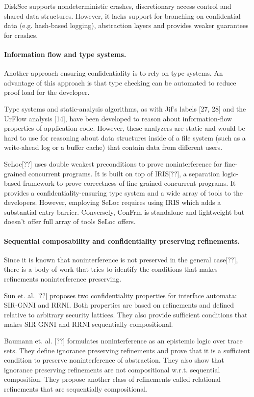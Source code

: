 DiskSec supports nondeterministic crashes, discretionary access control and shared data structures. However, it lacks support for branching on confidential data (e.g. hash-based logging), abstraction layers and provides weaker guarantees for crashes.

\paragraph{Information flow and type systems.} 
Another approach ensuring confidentiality is to rely on type systems. An advantage of this approach is that type checking can be automated to reduce proof load for the developer.

Type systems and static-analysis algorithms, as with
Jif’s labels [27, 28] and the UrFlow analysis [14], have been
developed to reason about information-flow properties of
application code. However, these analyzers are static and
would be hard to use for reasoning about data structures
inside of a file system (such as a write-ahead log or a
buffer cache) that contain data from different users.

SeLoc[??] uses double weakest preconditions to prove noninterference for fine-grained concurrent programs. It is built on top of IRIS[??], a separation logic-based framework to prove correctness of fine-grained concurrent programs. It provides a confidentiality-ensuring type system and a wide array of tools to the developers. However, employing SeLoc requires using IRIS which adds a substantial entry barrier. Conversely, ConFrm is standalone and lightweight but doesn't offer full array of tools SeLoc offers.

\paragraph{Sequential composability and confidentiality preserving refinements.} 
Since it is known that noninterference is not preserved in the general case[??],
there is a body of work that tries to identify the conditions that makes refinements noninterference preserving.
 
Sun et. al. [??] proposes two confidentiality properties for interface automata: SIR-GNNI and RRNI. Both properties are based on refinements and defined relative to arbitrary security lattices. They also provide sufficient conditions that makes SIR-GNNI and RRNI sequentially compositional. 

Baumann et. al. [??] formulates noninterference as an epistemic logic over trace sets. They define ignorance preserving refinements and prove that it is a sufficient condition to preserve noninterference of abstraction. They also show that ignorance preserving refinements are not compositional w.r.t. sequential composition. They propose another class of refinements called relational refinements that are sequentially compositional. 


